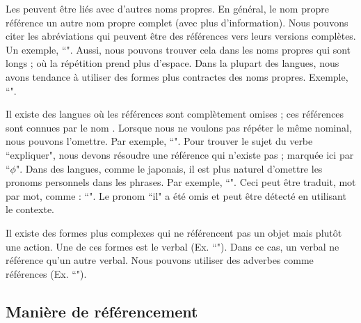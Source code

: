 \documentclass{KodeBook}
\begin{document}
Les  peuvent être liés avec d'autres noms propres. 
En général, le nom propre référence un autre nom propre complet (avec plus d'information). 
Nous pouvons citer les abréviations qui peuvent être des références vers leurs versions complètes.
Un exemple, ``".
Aussi, nous pouvons trouver cela dans les noms propres qui sont longs ; où la répétition prend plus d'espace. 
Dans la plupart des langues, nous avons tendance à utiliser des formes plus contractes des noms propres. 
Exemple, ``".

Il existe des langues où les références sont complètement omises ; ces références sont connues par le nom . 
Lorsque nous ne voulons pas répéter le même  nominal, nous pouvons l'omettre. 
Par exemple, ``".
Pour trouver le sujet du verbe ``expliquer", nous devons résoudre une référence qui n'existe pas ; marquée ici par ``$ \phi $".
Dans des langues, comme le japonais, il est plus naturel d'omettre les pronoms personnels dans les phrases. 
Par exemple, ``". 
Ceci peut être traduit, mot par mot, comme : ``".
Le pronom ``il" a été omis et peut être détecté en utilisant le contexte.

Il existe des formes plus complexes qui ne référencent pas un objet mais plutôt une action.
Une de ces formes est le  verbal (Ex. ``").
Dans ce cas, un  verbal ne référence qu'un autre  verbal. 
Nous pouvons utiliser des adverbes comme références (Ex. ``").


\subsection{Manière de référencement}
\end{document}
